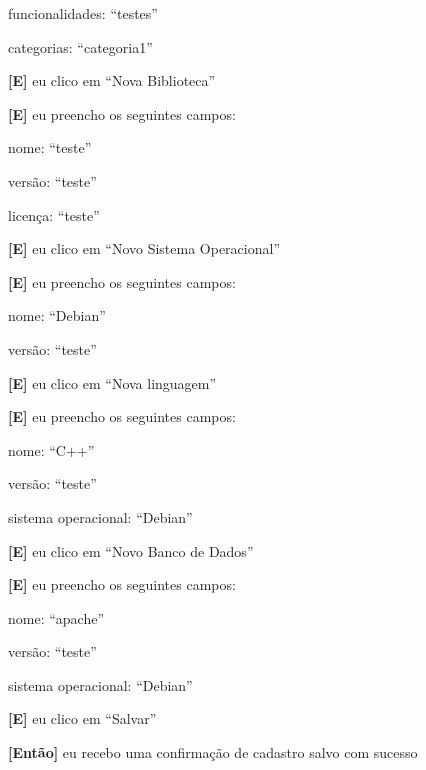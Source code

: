 \begin{itemize}
        \subitem funcionalidades: ``testes''

        \subitem categorias: ``categoria1''
    
    \textbf{[E]} eu clico em ``Nova Biblioteca''

    \textbf{[E]} eu preencho os seguintes campos: 

        \subitem nome: ``teste''

        \subitem versão: ``teste''

        \subitem licença: ``teste''

    \textbf{[E]} eu clico em ``Novo Sistema Operacional''

    \textbf{[E]} eu preencho os seguintes campos: 

        \subitem nome: ``Debian''

        \subitem versão: ``teste''

    \textbf{[E]} eu clico em ``Nova linguagem''

    \textbf{[E]} eu preencho os seguintes campos: 

        \subitem nome: ``C++''

        \subitem versão: ``teste''

        \subitem sistema operacional: ``Debian''

    \textbf{[E]} eu clico em ``Novo Banco de Dados''

    \textbf{[E]} eu preencho os seguintes campos: 

        \subitem nome: ``apache''

        \subitem versão: ``teste''

        \subitem sistema operacional: ``Debian''

    \textbf{[E]} eu clico em ``Salvar''

    \textbf{[Então]} eu recebo uma confirmação de cadastro salvo com sucesso
    
    
\end{itemize}